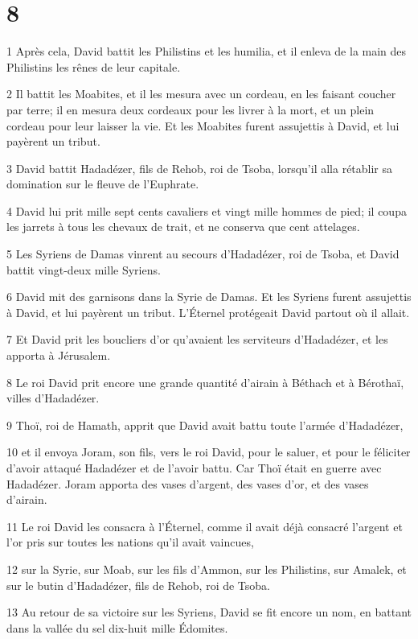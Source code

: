 \chapter{8}

\par 1 Après cela, David battit les Philistins et les humilia, et il enleva de la main des Philistins les rênes de leur capitale.
\par 2 Il battit les Moabites, et il les mesura avec un cordeau, en les faisant coucher par terre; il en mesura deux cordeaux pour les livrer à la mort, et un plein cordeau pour leur laisser la vie. Et les Moabites furent assujettis à David, et lui payèrent un tribut.
\par 3 David battit Hadadézer, fils de Rehob, roi de Tsoba, lorsqu'il alla rétablir sa domination sur le fleuve de l'Euphrate.
\par 4 David lui prit mille sept cents cavaliers et vingt mille hommes de pied; il coupa les jarrets à tous les chevaux de trait, et ne conserva que cent attelages.
\par 5 Les Syriens de Damas vinrent au secours d'Hadadézer, roi de Tsoba, et David battit vingt-deux mille Syriens.
\par 6 David mit des garnisons dans la Syrie de Damas. Et les Syriens furent assujettis à David, et lui payèrent un tribut. L'Éternel protégeait David partout où il allait.
\par 7 Et David prit les boucliers d'or qu'avaient les serviteurs d'Hadadézer, et les apporta à Jérusalem.
\par 8 Le roi David prit encore une grande quantité d'airain à Béthach et à Bérothaï, villes d'Hadadézer.
\par 9 Thoï, roi de Hamath, apprit que David avait battu toute l'armée d'Hadadézer,
\par 10 et il envoya Joram, son fils, vers le roi David, pour le saluer, et pour le féliciter d'avoir attaqué Hadadézer et de l'avoir battu. Car Thoï était en guerre avec Hadadézer. Joram apporta des vases d'argent, des vases d'or, et des vases d'airain.
\par 11 Le roi David les consacra à l'Éternel, comme il avait déjà consacré l'argent et l'or pris sur toutes les nations qu'il avait vaincues,
\par 12 sur la Syrie, sur Moab, sur les fils d'Ammon, sur les Philistins, sur Amalek, et sur le butin d'Hadadézer, fils de Rehob, roi de Tsoba.
\par 13 Au retour de sa victoire sur les Syriens, David se fit encore un nom, en battant dans la vallée du sel dix-huit mille Édomites.
